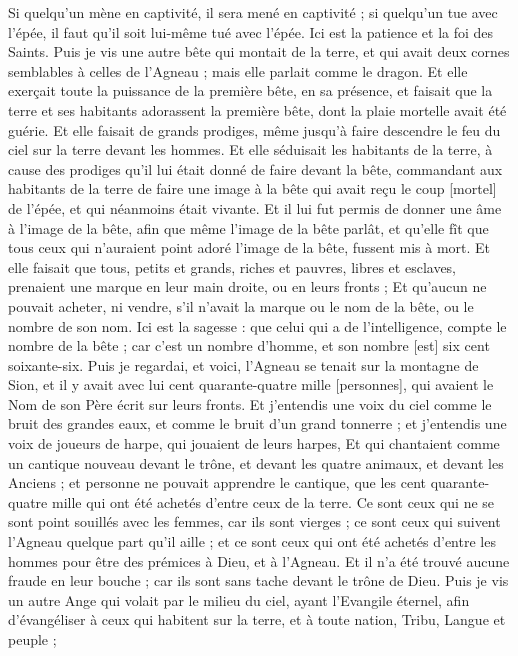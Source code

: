 \begin{multicols}{2}
Si quelqu'un mène en captivité, il sera mené en captivité ; si quelqu'un tue avec l'épée, il faut qu'il soit lui-même tué avec l'épée. Ici est la patience et la foi des Saints.
Puis je vis une autre bête qui montait de la terre, et qui avait deux cornes semblables à celles de l'Agneau ; mais elle parlait comme le dragon.
Et elle exerçait toute la puissance de la première bête, en sa présence, et faisait que la terre et ses habitants adorassent la première bête, dont la plaie mortelle avait été guérie.
Et elle faisait de grands prodiges, même jusqu'à faire descendre le feu du ciel sur la terre devant les hommes.
Et elle séduisait les habitants de la terre, à cause des prodiges qu'il lui était donné de faire devant la bête, commandant aux habitants de la terre de faire une image à la bête qui avait reçu le coup [mortel] de l'épée, et qui néanmoins était vivante.
Et il lui fut permis de donner une âme à l'image de la bête, afin que même l'image de la bête parlât, et qu'elle fît que tous ceux qui n'auraient point adoré l'image de la bête, fussent mis à mort.
Et elle faisait que tous, petits et grands, riches et pauvres, libres et esclaves, prenaient une marque en leur main droite, ou en leurs fronts ;
Et qu'aucun ne pouvait acheter, ni vendre, s'il n'avait la marque ou le nom de la bête, ou le nombre de son nom.
Ici est la sagesse : que celui qui a de l'intelligence, compte le nombre de la bête ; car c'est un nombre d'homme, et son nombre [est] six cent soixante-six.
\VerseOne{}Puis je regardai, et voici, l'Agneau se tenait sur la montagne de Sion, et il y avait avec lui cent quarante-quatre mille [personnes], qui avaient le Nom de son Père écrit sur leurs fronts.
Et j'entendis une voix du ciel comme le bruit des grandes eaux, et comme le bruit d'un grand tonnerre ; et j'entendis une voix de joueurs de harpe, qui jouaient de leurs harpes,
Et qui chantaient comme un cantique nouveau devant le trône, et devant les quatre animaux, et devant les Anciens ; et personne ne pouvait apprendre le cantique, que les cent quarante-quatre mille qui ont été achetés d'entre ceux de la terre.
Ce sont ceux qui ne se sont point souillés avec les femmes, car ils sont vierges ; ce sont ceux qui suivent l'Agneau quelque part qu'il aille ; et ce sont ceux qui ont été achetés d'entre les hommes pour être des prémices à Dieu, et à l'Agneau.
Et il n'a été trouvé aucune fraude en leur bouche ; car ils sont sans tache devant le trône de Dieu.
Puis je vis un autre Ange qui volait par le milieu du ciel, ayant l'Evangile éternel, afin d'évangéliser à ceux qui habitent sur la terre, et à toute nation, Tribu, Langue et peuple ;

\end{multicols}
